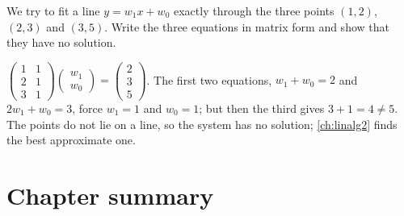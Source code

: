 \begin{exercise}
We try to fit a line $y = w_1x + w_0$ exactly through the three points
$(1, 2)$, $(2, 3)$ and $(3, 5)$. Write the three equations in matrix form and
show that they have no solution.
\end{exercise}
\begin{solution}
$\left(\begin{smallmatrix} 1 & 1\\ 2 & 1\\ 3 & 1\end{smallmatrix}\right)
\left(\begin{smallmatrix} w_1\\ w_0\end{smallmatrix}\right) =
\left(\begin{smallmatrix} 2\\ 3\\ 5\end{smallmatrix}\right)$. The first two
equations, $w_1 + w_0 = 2$ and $2w_1 + w_0 = 3$, force $w_1 = 1$ and $w_0 = 1$;
but then the third gives $3 + 1 = 4 \neq 5$. The points do not lie on a line,
so the system has no solution; \cref{ch:linalg2} finds the best approximate
one.
\end{solution}

\section{Chapter summary}\label{sec:ch4-summary}

